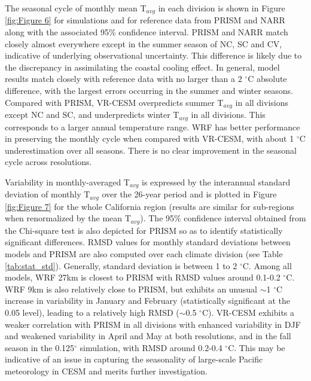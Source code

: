 \documentclass[ms,draft]{agutex}   %
\begin{document}
\begin{article}
The seasonal cycle of monthly mean T$_{avg}$ in each division is shown in Figure \ref{fig:Figure 6} for simulations and for reference data from PRISM and NARR along with the associated 95\% confidence interval. PRISM and NARR match closely almost everywhere except in the summer season of NC, SC and CV, indicative of underlying observational uncertainty. This difference is likely due to the discrepancy in assimilating the coastal cooling effect.  In general, model results match closely with reference data with no larger than a 2 $^\circ$C absolute difference, with the largest errors occurring in the summer and winter seasons.  Compared with PRISM, VR-CESM overpredicts summer T$_{avg}$ in all divisions except NC and SC, and underpredicts winter T$_{avg}$ in all divisions.  This corresponds to a larger annual temperature range. WRF has better performance in preserving the monthly cycle when compared with VR-CESM, with about 1 $^\circ$C underestimation over all seasons. There is no clear improvement in the seasonal cycle across resolutions.

Variability in monthly-averaged T$_{avg}$ is expressed by the interannual standard deviation of monthly T$_{avg}$ over the 26-year period and is plotted in Figure \ref{fig:Figure 7} for the whole California region (results are similar for sub-regions when renormalized by the mean T$_{avg}$). The 95\% confidence interval obtained from the Chi-square test is also depicted for PRISM so as to identify statistically significant differences.  RMSD values for monthly standard deviations between models and PRISM are also computed over each climate division (see Table \ref{tab:stat_std}). Generally, standard deviation is between 1 to 2 $^\circ$C. Among all models, WRF 27km is closest to PRISM with RMSD values around 0.1-0.2 $^\circ$C. WRF 9km is also relatively close to PRISM, but exhibits an unusual $\sim$1 $^\circ$C increase in variability in January and February (statistically significant at the 0.05 level), leading to a relatively high RMSD ($\sim$0.5 $^\circ$C). VR-CESM exhibits a weaker correlation with PRISM in all divisions with enhanced variability in DJF and weakened variability in April and May at both resolutions, and in the fall season in the 0.125$^\circ$ simulation, with RMSD around 0.2-0.4 $^\circ$C.  This may be indicative of an issue in capturing the seasonality of large-scale Pacific meteorology in CESM and merits further investigation.


\end{article}
\end{document}
